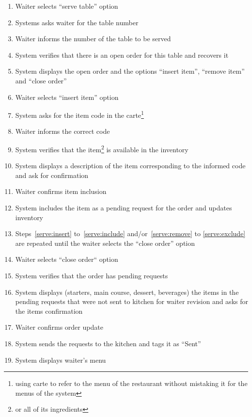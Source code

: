 \documentclass[a4paper,11pt,oneside]{book}
\newcommand{\tinytodo}[2][]{\todo[caption={#2}, size=\footnotesize, #1]{\renewcommand{\baselinestretch}{0.5}\selectfont#2\par}}
\newcommand{\menu}[1]{System displays #1's menu}
\begin{document}
\begin{enumerate}
  \item Waiter selects ``serve table'' option
  \item \label{serve:ask-number} Systems asks waiter for the table number
  \item \label{serve:inform-number} Waiter informs the number of the table to be served
  \item \label{serve:verify-number} System verifies that there is an open order for this table and recovers it
  \item \label{serve:options} System displays the open order and the options ``insert item'', ``remove item'' and ``close order''
  \item \label{serve:insert} Waiter selects ``insert item'' option
  \item \label{serve:ask-item}System asks for the item code in the carte\footnote{using carte to refer to the menu of the restaurant without mistaking it for the menus of the system}
  \item \label{serve:insert-code} Waiter informs the correct code
  \item \label{serve:verify-item} System verifies that the item\footnote{or all of its ingredients} is available in the inventory
  \item System displays a description of the item corresponding to the informed code and ask for confirmation
  \item \label{serve:confirm-item} Waiter confirms item inclusion
  \item \label{serve:include} System includes the item as a pending request for the order and updates inventory
  \item Steps~\ref{serve:insert} to~\ref{serve:include} and/or~\ref{serve:remove} to \ref{serve:exclude} are repeated until the waiter selects the ``close order'' option
  \item Waiter selects ``close order`` option
  \item \label{serve:verify-order} System verifies that the order has pending requests
  \item System displays (starters, main course, dessert, beverages) the items in the pending requests that were not sent to kitchen for waiter revision and asks for the items confirmation
  \item \label{serve:confirm-order} Waiter confirms order update \tinytodo{review: when is the order created?}
  \item System sends the requests to the kitchen and tags it as ``Sent''
  \item \menu{waiter}
\end{enumerate}
\end{document}
